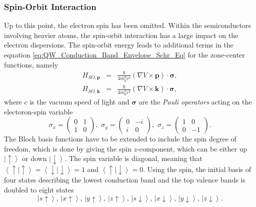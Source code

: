 \newpage{}


\subsubsection{Spin-Orbit Interaction}

Up to this point, the electron spin has been omitted. Within the semiconductors
involving heavier atoms, the spin-orbit interaction has a large impact
on the electron dispersions. The spin-orbit energy leads to additional
terms in the equation \ref{eq:QW_Conduction_Band_Envelope_Schr_Eq}
for the zone-center functions, namely\begin{eqnarray}
H_{SO,\mathbf{p}} & = & \frac{\hbar}{4m_{0}^{2}c^{2}}\left(\nabla V\times\mathbf{p}\right)\cdot\boldsymbol{\sigma},\label{eq:spin_orbit_int_p}\\
H_{SO,\mathbf{k}} & = & \frac{\hbar}{4m_{0}^{2}c^{2}}\left(\nabla V\times\mathbf{k}\right)\cdot\mathbf{\boldsymbol{\sigma}},\label{eq:spin_orbit_int_k}\end{eqnarray}
where $c$ is the vacuum speed of light and $\boldsymbol{\sigma}$
are the \emph{Pauli operators} acting on the electoron-spin variable\[
\sigma_{x}=\left(\begin{array}{cc}
0 & 1\\
1 & 0\end{array}\right),\,\,\sigma_{y}=\left(\begin{array}{cc}
0 & -i\\
i & 0\end{array}\right),\,\,\sigma_{z}=\left(\begin{array}{cc}
1 & 0\\
0 & -1\end{array}\right).\]
The Bloch basis functions have to be extended to include the spin
degree of freedom, which is done by giving the spin $z$-component,
which can be either up $\left|\uparrow\right\rangle $ or down $\left|\downarrow\right\rangle $.
The spin variable is diagonal, meaning that $\left\langle \uparrow\mid\uparrow\right\rangle =\left\langle \downarrow\mid\downarrow\right\rangle =1$
and $\left\langle \uparrow\mid\downarrow\right\rangle =0$. Using
the spin, the initial basis of four states describing the lowest conduction
band and the top valence bands is doubled to eight states\begin{equation}
\left|s\uparrow\right\rangle ,\,\left|x\uparrow\right\rangle ,\,\left|y\uparrow\right\rangle ,\,\left|z\uparrow\right\rangle ,\,\left|s\downarrow\right\rangle ,\,\left|x\downarrow\right\rangle ,\,\left|y\downarrow\right\rangle ,\,\left|z\downarrow\right\rangle .\label{eq:levels_basis_with_spin}\end{equation}
